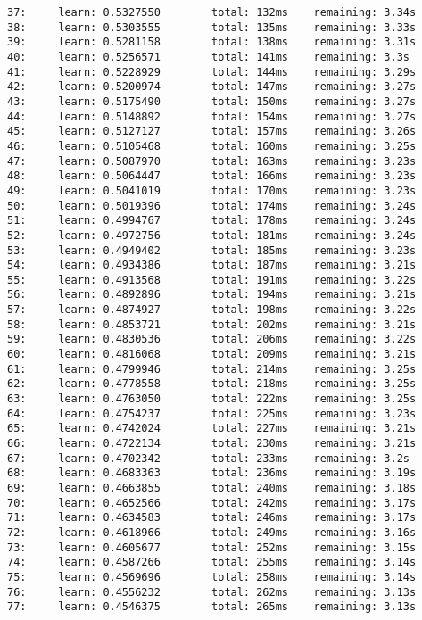 \documentclass[11pt]{article}
\begin{document}
\begin{Verbatim}[commandchars=\\\{\}]
37:     learn: 0.5327550        total: 132ms    remaining: 3.34s
38:     learn: 0.5303555        total: 135ms    remaining: 3.33s
39:     learn: 0.5281158        total: 138ms    remaining: 3.31s
40:     learn: 0.5256571        total: 141ms    remaining: 3.3s
41:     learn: 0.5228929        total: 144ms    remaining: 3.29s
42:     learn: 0.5200974        total: 147ms    remaining: 3.27s
43:     learn: 0.5175490        total: 150ms    remaining: 3.27s
44:     learn: 0.5148892        total: 154ms    remaining: 3.27s
45:     learn: 0.5127127        total: 157ms    remaining: 3.26s
46:     learn: 0.5105468        total: 160ms    remaining: 3.25s
47:     learn: 0.5087970        total: 163ms    remaining: 3.23s
48:     learn: 0.5064447        total: 166ms    remaining: 3.23s
49:     learn: 0.5041019        total: 170ms    remaining: 3.23s
50:     learn: 0.5019396        total: 174ms    remaining: 3.24s
51:     learn: 0.4994767        total: 178ms    remaining: 3.24s
52:     learn: 0.4972756        total: 181ms    remaining: 3.24s
53:     learn: 0.4949402        total: 185ms    remaining: 3.23s
54:     learn: 0.4934386        total: 187ms    remaining: 3.21s
55:     learn: 0.4913568        total: 191ms    remaining: 3.22s
56:     learn: 0.4892896        total: 194ms    remaining: 3.21s
57:     learn: 0.4874927        total: 198ms    remaining: 3.22s
58:     learn: 0.4853721        total: 202ms    remaining: 3.21s
59:     learn: 0.4830536        total: 206ms    remaining: 3.22s
60:     learn: 0.4816068        total: 209ms    remaining: 3.21s
61:     learn: 0.4799946        total: 214ms    remaining: 3.25s
62:     learn: 0.4778558        total: 218ms    remaining: 3.25s
63:     learn: 0.4763050        total: 222ms    remaining: 3.25s
64:     learn: 0.4754237        total: 225ms    remaining: 3.23s
65:     learn: 0.4742024        total: 227ms    remaining: 3.21s
66:     learn: 0.4722134        total: 230ms    remaining: 3.21s
67:     learn: 0.4702342        total: 233ms    remaining: 3.2s
68:     learn: 0.4683363        total: 236ms    remaining: 3.19s
69:     learn: 0.4663855        total: 240ms    remaining: 3.18s
70:     learn: 0.4652566        total: 242ms    remaining: 3.17s
71:     learn: 0.4634583        total: 246ms    remaining: 3.17s
72:     learn: 0.4618966        total: 249ms    remaining: 3.16s
73:     learn: 0.4605677        total: 252ms    remaining: 3.15s
74:     learn: 0.4587266        total: 255ms    remaining: 3.14s
75:     learn: 0.4569696        total: 258ms    remaining: 3.14s
76:     learn: 0.4556232        total: 262ms    remaining: 3.13s
77:     learn: 0.4546375        total: 265ms    remaining: 3.13s

\end{Verbatim}
\end{document}
